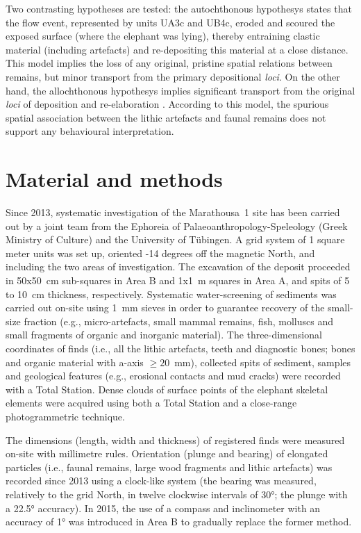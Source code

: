 \documentclass[preprint,authoryear,times]{elsarticle} %
\begin{document}
Two contrasting hypotheses are tested: the autochthonous hypothesys \citep[\emph{sensu}][]{Fernandez-Lopez1991,Dominguez-Rodrigo2012} states that the flow event, represented by units UA3c and UB4c, eroded and scoured the exposed surface (where the elephant was lying), thereby entraining clastic material (including artefacts) and re-depositing \citep[\emph{sensu}][]{Fernandez-Lopez1991} this material at a close distance. This model implies the loss of any original, pristine spatial relations between remains, but minor transport from the primary depositional \emph{loci}. On the other hand, the allochthonous hypothesys \citep[\emph{sensu}][]{Fernandez-Lopez1991,Dominguez-Rodrigo2012} implies significant transport from the original \emph{loci} of deposition and re-elaboration \citep[\emph{sensu}][]{Fernandez-Lopez1991}. According to this model, the spurious spatial association between the lithic artefacts and faunal remains does not support any behavioural interpretation.

\section{Material and methods}

Since 2013, systematic investigation of the Marathousa~1 site has been carried out by a joint team from the Ephoreia of Palaeoanthropology-Speleology (Greek Ministry of Culture) and the University of Tübingen. A grid system of 1 square meter units was set up, oriented -14 degrees off the magnetic North, and including the two areas of investigation. The excavation of the deposit proceeded in 50x50~cm sub-squares in Area B and 1x1~m squares in Area A, and spits of 5 to 10~cm thickness, respectively. Systematic water-screening of sediments was carried out on-site using 1~mm sieves in order to guarantee recovery of the small-size fraction (e.g., micro-artefacts, small mammal remains, fish, molluscs and small fragments of organic and inorganic material). The three-dimensional coordinates of finds (i.e., all the lithic artefacts, teeth and diagnostic bones; bones and organic material with a-axis $\geq20$~mm), collected spits of sediment, samples and geological features (e.g., erosional contacts and mud cracks) were recorded with a Total Station. Dense clouds of surface points of the elephant skeletal elements were acquired using both a Total Station and a close-range photogrammetric technique.

The dimensions (length, width and thickness) of registered finds were measured on-site with millimetre rules. Orientation (plunge and bearing) of elongated particles (i.e., faunal remains, large wood fragments and lithic artefacts) was recorded since 2013 using a clock-like system (the bearing was measured, relatively to the grid North, in twelve clockwise intervals of 30°; the plunge with a 22.5° accuracy). In 2015, the use of a compass and inclinometer with an accuracy of 1° was introduced in Area B to gradually replace the former method.
\end{document}

